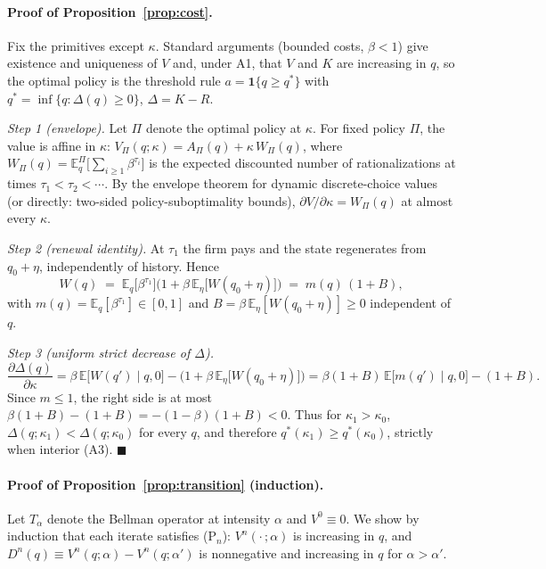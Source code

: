 \paragraph{Proof of Proposition~\ref{prop:cost}.}
Fix the primitives except $\kappa$. Standard arguments (bounded costs,
$\beta < 1$) give existence and uniqueness of $V$ and, under A1, that $V$
and $K$ are increasing in $q$, so the optimal policy is the threshold rule
$a = \mathbf{1}\{q \geq q^*\}$ with $q^* = \inf\{q : \Delta(q) \geq 0\}$,
$\Delta = K - R$.

\emph{Step 1 (envelope).} Let $\Pi$ denote the optimal policy at $\kappa$.
For fixed policy $\Pi$, the value is affine in $\kappa$:
$V_\Pi(q; \kappa) = A_\Pi(q) + \kappa\, W_\Pi(q)$, where
$W_\Pi(q) = \mathbb{E}^\Pi_q\big[\sum_{i \geq 1} \beta^{\tau_i}\big]$ is
the expected discounted number of rationalizations at times
$\tau_1 < \tau_2 < \cdots$. By the envelope theorem for dynamic
discrete-choice values (or directly: two-sided policy-suboptimality
bounds), $\partial V/\partial \kappa = W_{\Pi}(q)$ at almost every
$\kappa$.

\emph{Step 2 (renewal identity).} At $\tau_1$ the firm pays and the state
regenerates from $q_0 + \eta$, independently of history. Hence
\[
    W(q) \;=\; \mathbb{E}_q\big[\beta^{\tau_1}\big]\Big(1 +
    \beta\,\mathbb{E}_\eta\big[W(q_0+\eta)\big]\Big)
    \;=\; m(q)\,(1 + B),
\]
with $m(q) = \mathbb{E}_q[\beta^{\tau_1}] \in [0, 1]$ and
$B = \beta\,\mathbb{E}_\eta[W(q_0+\eta)] \geq 0$ independent of $q$.

\emph{Step 3 (uniform strict decrease of $\Delta$).}
\[
    \frac{\partial \Delta(q)}{\partial \kappa}
    = \beta\,\mathbb{E}\big[W(q') \mid q, 0\big] - \Big(1 +
      \beta\,\mathbb{E}_\eta\big[W(q_0+\eta)\big]\Big)
    = \beta (1+B)\, \mathbb{E}\big[m(q') \mid q, 0\big] - (1 + B).
\]
Since $m \leq 1$, the right side is at most
$\beta(1+B) - (1+B) = -(1-\beta)(1+B) < 0$. Thus for $\kappa_1 > \kappa_0$,
$\Delta(q; \kappa_1) < \Delta(q; \kappa_0)$ for every $q$, and therefore
$q^*(\kappa_1) \geq q^*(\kappa_0)$, strictly when interior (A3).
\hfill$\blacksquare$

\paragraph{Proof of Proposition~\ref{prop:transition} (induction).}
Let $T_\alpha$ denote the Bellman operator at intensity $\alpha$ and
$V^0 \equiv 0$. We show by induction that each iterate satisfies
(P$_n$): $V^n(\cdot\,; \alpha)$ is increasing in $q$, and
$D^n(q) \equiv V^n(q; \alpha) - V^n(q; \alpha')$ is nonnegative and
increasing in $q$ for $\alpha > \alpha'$.

